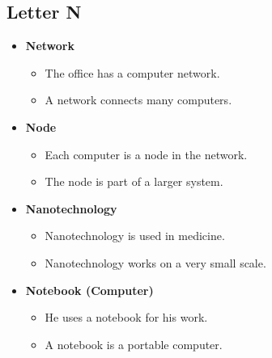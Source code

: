     \subsection{Letter N}
    \begin{itemize}
        \item \textbf{Network}
        \begin{itemize}
            \item The office has a computer network.
            \item A network connects many computers.
        \end{itemize}
        \item \textbf{Node}
        \begin{itemize}
            \item Each computer is a node in the network.
            \item The node is part of a larger system.
        \end{itemize}
        \item \textbf{Nanotechnology}
        \begin{itemize}
            \item Nanotechnology is used in medicine.
            \item Nanotechnology works on a very small scale.
        \end{itemize}
        \item \textbf{Notebook (Computer)}
        \begin{itemize}
            \item He uses a notebook for his work.
            \item A notebook is a portable computer.
        \end{itemize}
    \end{itemize}

